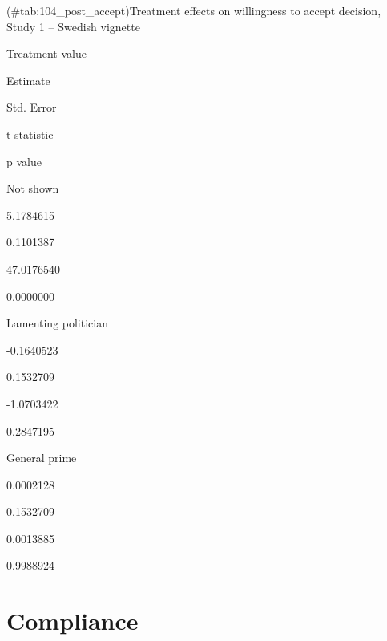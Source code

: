 \documentclass[]{book}
\begin{document}
(\#tab:104\_post\_accept)Treatment effects on willingness to accept
decision, Study 1 -- Swedish vignette

Treatment value

Estimate

Std. Error

t-statistic

p value

Not shown

5.1784615

0.1101387

47.0176540

0.0000000

Lamenting politician

-0.1640523

0.1532709

-1.0703422

0.2847195

General prime

0.0002128

0.1532709

0.0013885

0.9988924

\section{Compliance}\label{compliance}
\end{document}

